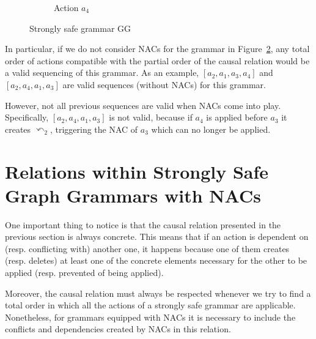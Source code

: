 \begin{example}
\begin{figure}[!ht]
\begin{subfigure}[t]{.2\textwidth}
    \caption{Action $a_4$}\label{fig:process:unconditional-relation:a4}
  \end{subfigure}
  \caption{Strongly safe grammar GG}\label{fig:process:unconditional-relation}
\end{figure}

  In particular, if we do not consider NACs for the grammar in Figure~\ref{fig:process:unconditional-relation}, any total order of actions compatible with the partial order of the causal relation would be a valid sequencing of this grammar. As an example, $[a_2, a_1, a_3, a_4]$ and $[a_2, a_4, a_1, a_3]$ are valid sequences (without NACs) for this grammar. 

  However, not all previous sequences are valid when NACs come into play. Specifically, $[a_2, a_4, a_1, a_3]$ is not valid, because if $a_4$ is applied before $a_3$ it creates $\curvearrowleft_2$, triggering the NAC of $a_3$ which can no longer be applied. 
\end{example}

\section{Relations within Strongly Safe Graph Grammars with NACs}

One important thing to notice is that the causal relation presented in the previous section is always concrete. This means that if an action is dependent on (resp. conflicting with) another one, it happens because one of them creates (resp. deletes) at least one of the concrete elements necessary for the other to be applied (resp. prevented of being applied).

Moreover, the causal relation must always be respected whenever we try to find a total order in which all the actions of a strongly safe grammar are applicable. Nonetheless, for grammars equipped with NACs it is necessary to include the conflicts and dependencies created by NACs in this relation.

